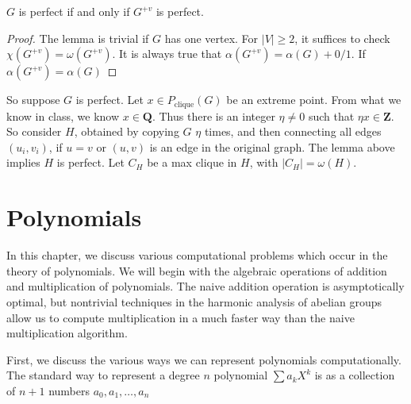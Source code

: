 \begin{lemma}
    $G$ is perfect if and only if $G^{+v}$ is perfect.
\end{lemma}
\begin{proof}
    The lemma is trivial if $G$ has one vertex. For $|V| \geq 2$, it suffices to check $\chi(G^{+v}) = \omega(G^{+v})$. It is always true that $\alpha(G^{+v}) = \alpha(G) + 0/1$. If $\alpha(G^{+v}) = \alpha(G)$
\end{proof}

So suppose $G$ is perfect. Let $x \in P_{\text{clique}}(G)$ be an extreme point. From what we know in class, we know $x \in \mathbf{Q}$. Thus there is an integer $\eta \neq 0$ such that $\eta x \in \mathbf{Z}$. So consider $H$, obtained by copying $G$ $\eta$ times, and then connecting all edges $(u_i,v_i)$, if $u = v$ or $(u,v)$ is an edge in the original graph. The lemma above implies $H$ is perfect. Let $C_H$ be a max clique in $H$, with $|C_H| = \omega(H)$.

\chapter{Polynomials}

In this chapter, we discuss various computational problems which occur in the theory of polynomials. We will begin with the algebraic operations of addition and multiplication of polynomials. The naive addition operation is asymptotically optimal, but nontrivial techniques in the harmonic analysis of abelian groups allow us to compute multiplication in a much faster way than the naive multiplication algorithm.

First, we discuss the various ways we can represent polynomials computationally. The standard way to represent a degree $n$ polynomial $\sum a_k X^k$ is as a collection of $n+1$ numbers $a_0,a_1,\dots,a_n$

